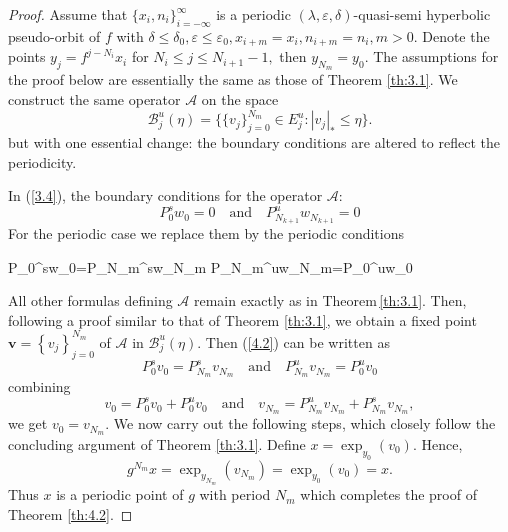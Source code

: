 \documentclass[12pt]{article}
\begin{document}
\begin{proof}
	Assume that $  \{x_{i},n_{i}\}_{i=-\infty}^{\infty} $ is a periodic $(\lambda,\varepsilon,\delta)$-quasi-semi hyperbolic pseudo-orbit of $ f $ with $ \delta\leq\delta_0,\varepsilon\leq\varepsilon_0,x_{i+m}=x_{i},n_{i+m}=n_{i},m>0 $. Denote the points $  y_{j}=f^{j-N_{i}}x_{i}$ for $ N_{i}\leqslant j\leqslant N_{i+1}-1,$ then $y_{N_{m}}=y_0 $. 
	The assumptions for the proof below are essentially the same as those of Theorem \ref{th:3.1}. We construct the same operator $ \mathcal{A} $ on the space $$
	\mathcal{B}_{j}^{u}(\eta)=\{\{v_{j}\}_{j=0}^{N_{m}}\in E_{j}^{u}:|v_{j}|_{*}\leqslant\eta\}.
	$$
	but with one essential change: the boundary conditions​ are altered to reflect the periodicity.
	
	In (\ref{3.4}),	the boundary conditions for the operator $ \mathcal{A} :$
	$$
	P_{0}^{s}w_{0}=0 \quad \text{and} \quad P_{N_{k+1}}^{u}w_{N_{k+1}}=0
	$$
	For the periodic case we replace them by the periodic conditions 
	\begin{flalign}\label{4.2}
		\begin{split}
			P_{0}^{s}w_{0}=P_{N_{m}}^{s}w_{N_{m}} \quad {} \quad P_{N_{m}}^{u}w_{N_{m}}=P_{0}^{u}w_{0}
		\end{split}
	\end{flalign}
	All other formulas defining $ \mathcal{A} $ remain exactly as in Theorem \ref{th:3.1}.
	Then, following a proof similar to that of Theorem \ref{th:3.1}, we obtain a fixed point  $ \boldsymbol{v}=\left\{v_j\right\}_{j=0}^{N_{m}} $ of $ \mathcal{A} $ in $ \mathcal{B}_{j}^{u}(\eta) $. Then (\ref{4.2}) can be written as 
	$$
	P_{0}^{s}v_{0}=P_{N_{m}}^{s}v_{N_{m}} \quad \text{and} \quad P_{N_{m}}^{u}v_{N_{m}}=P_{0}^{u}v_{0}
	$$
	combining 
	$$
	v_{0}=P_{0}^{s}v_{0}+P_{0}^{u}v_{0} \quad \text{and} \quad v_{N_{m}}=P_{N_{m}}^{u}v_{N_{m}}+P_{N_{m}}^{s}v_{N_{m}},
	$$
	we get $ v_{0}=v_{N_{m}} $. We now carry out the following steps, which closely follow the concluding argument of Theorem \ref{th:3.1}. Define $ x=\exp_{y_0}(v_0)$. Hence,
	$$
	g^{N_{m}}x=\exp_{y_{N_{m}}}(v_{N_{m}})=\exp_{y_0}(v_0)=x.
	$$ Thus $ x $ is a periodic point of $ g $ with period $ N_{m} $ which completes the proof of Theorem \ref{th:4.2}.
\end{proof}
\end{document}
